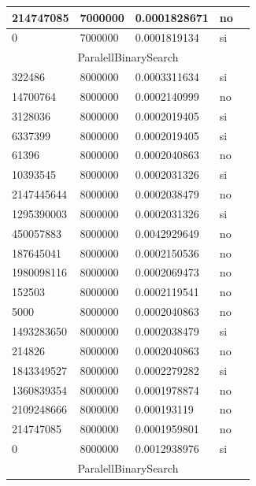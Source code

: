 \documentclass[12pt, fleqn]{article}                             %
\theoremstyle{break}                                            %
\begin{document}
\begin{longtable}{|m{5em}|m{5em}|m{10em}|m{5em}|@{}m{0pt}@{}}
            214747085& 7000000  & 0.0001828671 & no &\\[1em]    \hline
            0& 7000000  & 0.0001819134 & si &\\[1em]    \hline
            \multicolumn{5}{|c|}{ParalellBinarySearch}   \\          \hline
            322486& 8000000  & 0.0003311634 & si &\\[1em]    \hline
            14700764& 8000000  & 0.0002140999 & no &\\[1em]    \hline
            3128036& 8000000  & 0.0002019405 & si &\\[1em]    \hline
            6337399& 8000000  & 0.0002019405 & si &\\[1em]    \hline
            61396& 8000000  & 0.0002040863 & no &\\[1em]    \hline
            10393545& 8000000  & 0.0002031326 & si &\\[1em]    \hline
            2147445644& 8000000  & 0.0002038479 & no &\\[1em]    \hline
            1295390003& 8000000  & 0.0002031326 & si &\\[1em]    \hline
            450057883& 8000000  & 0.0042929649 & no &\\[1em]    \hline
            187645041& 8000000  & 0.0002150536 & no &\\[1em]    \hline
            1980098116& 8000000  & 0.0002069473 & no &\\[1em]    \hline
            152503& 8000000  & 0.0002119541 & no &\\[1em]    \hline
            5000& 8000000  & 0.0002040863 & no &\\[1em]    \hline
            1493283650& 8000000  & 0.0002038479 & si &\\[1em]    \hline
            214826& 8000000  & 0.0002040863 & no &\\[1em]    \hline
            1843349527& 8000000  & 0.0002279282 & si &\\[1em]    \hline
            1360839354& 8000000  & 0.0001978874 & no &\\[1em]    \hline
            2109248666& 8000000  & 0.000193119 & no &\\[1em]    \hline
            214747085& 8000000  & 0.0001959801 & no &\\[1em]    \hline
            0& 8000000  & 0.0012938976 & si &\\[1em]    \hline
            \multicolumn{5}{|c|}{ParalellBinarySearch}   \\          \hline

\end{longtable}
\end{document}
